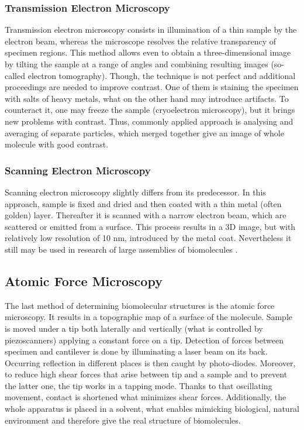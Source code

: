 	\subsubsection{Transmission Electron Microscopy} %
Transmission electron microscopy consists in illumination of a thin sample by the electron beam, whereas the microscope resolves the relative transparency of specimen regions. This method allows even to obtain a three-dimensional image by tilting the sample at a range of angles and combining resulting images (so-called electron tomography). Though, the technique is not perfect and additional proceedings are needed to improve contrast. One of them is staining the specimen with salts of heavy metals, what on the other hand may introduce artifacts. To counteract it, one may freeze the sample (cryoelectron microscopy), but it brings new problems with contrast. Thus, commonly applied approach is analysing and averaging of separate particles, which merged together give an image of whole molecule with good contrast.
	\subsubsection{Scanning Electron Microscopy} %
Scanning electron microscopy slightly differs from its predecessor. In this approach, sample is fixed and dried and then coated with a thin metal (often golden) layer. Thereafter it is scanned with a narrow electron beam, which are scattered or emitted from a surface. This process results in a 3D image, but with relatively low resolution of 10 nm, introduced by the metal coat. Nevertheless it still may be used in research of large assemblies of biomolecules \cite{Goodsell04}.
\subsection{Atomic Force Microscopy} %
The last method of determining biomolecular structures is the atomic force microscopy. It results in a topographic map of a surface of the molecule. Sample is moved under a tip both laterally and vertically (what is controlled by piezoscanners) applying a constant force on a tip. Detection of forces between specimen and cantilever is done by illuminating a laser beam on its back. Occurring reflection in different places is then caught by photo-diodes. Moreover, to reduce high shear forces that arise between tip and a sample and to prevent the latter one, the tip works in a tapping mode. Thanks to that oscillating movement, contact is shortened what minimizes shear forces. Additionally, the whole apparatus is placed in a solvent, what enables mimicking biological, natural environment and therefore give the real structure of biomolecules.

